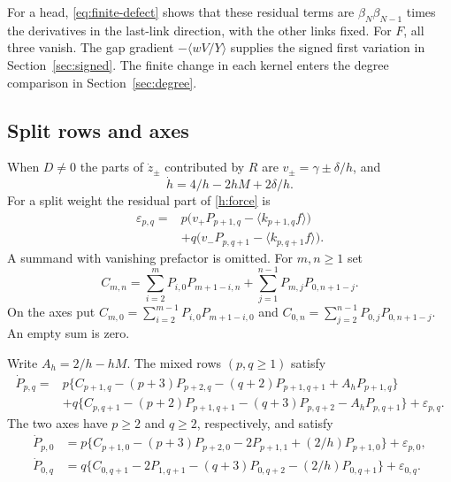 For a head, \eqref{eq:finite-defect} shows that these residual terms are
\(\beta_N\beta_{N-1}\) times the derivatives in the last-link
direction, with the other links fixed. For \(F\), all three vanish.
The gap gradient \(-\langle wV/Y\rangle\) supplies the signed first
variation in Section~\ref{sec:signed}. The finite change in each
kernel enters the degree comparison in Section~\ref{sec:degree}.

\subsection{Split rows and axes}

When \(D\ne0\) the parts of \(\dot z_\pm\) contributed by \(R\) are
\(v_\pm=\gamma\pm\delta/h\), and
\begin{equation}\label{h:split-gap}
 \dot h=4/h-2hM+2\delta/h .
\end{equation}
For a split weight the residual part of \eqref{h:force} is
\begin{equation}\label{h:split-force}
 \begin{split}
 \varepsilon_{p,q}={}&p\big(v_+P_{p+1,q}-\langle k_{p+1,q}f\rangle\big)\\
                    &+q\big(v_-P_{p,q+1}-\langle k_{p,q+1}f\rangle\big).
 \end{split}
\end{equation}
A summand with vanishing prefactor is omitted. For \(m,n\ge1\) set
\[
 C_{m,n}=\sum_{i=2}^m P_{i,0}P_{m+1-i,n}
         +\sum_{j=1}^{n-1}P_{m,j}P_{0,n+1-j}.
\]
On the axes put
\(C_{m,0}=\sum_{i=2}^{m-1}P_{i,0}P_{m+1-i,0}\) and
\(C_{0,n}=\sum_{j=2}^{n-1}P_{0,j}P_{0,n+1-j}\).
An empty sum is zero.

\begin{theorem}\label{h:splitthm}
Write \(A_h=2/h-hM\). The mixed rows \((p,q\ge1)\) satisfy
\begin{equation}\label{h:mixed}
\begin{split}
 \dot P_{p,q}={}&p\{C_{p+1,q}-(p+3)P_{p+2,q}
                   -(q+2)P_{p+1,q+1}+A_hP_{p+1,q}\}\\
 &+q\{C_{p,q+1}-(p+2)P_{p+1,q+1}
                   -(q+3)P_{p,q+2}-A_hP_{p,q+1}\}
   +\varepsilon_{p,q}.
\end{split}
\end{equation}
The two axes have \(p\ge2\) and \(q\ge2\), respectively, and satisfy
\begin{equation}\label{h:axes}
 \begin{split}
 \dot P_{p,0}&=p\{C_{p+1,0}-(p+3)P_{p+2,0}-2P_{p+1,1}
                          +(2/h)P_{p+1,0}\}+\varepsilon_{p,0},\\
 \dot P_{0,q}&=q\{C_{0,q+1}-2P_{1,q+1}-(q+3)P_{0,q+2}
                          -(2/h)P_{0,q+1}\}+\varepsilon_{0,q}.
 \end{split}
\end{equation}
\end{theorem}

